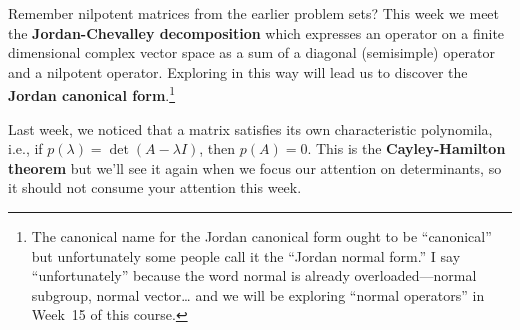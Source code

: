 \documentclass{homework}
\begin{document}
Remember nilpotent matrices from the earlier problem sets?  This week
we meet the \textbf{Jordan-Chevalley decomposition} which expresses an
operator on a finite dimensional complex vector space as a sum of a
diagonal (semisimple) operator and a nilpotent operator.  Exploring in
this way will lead us to discover the \textbf{Jordan canonical
  form}.\footnote{The canonical name for the Jordan canonical form
  ought to be ``canonical'' but unfortunately some people call it the
  ``Jordan normal form.''  I say ``unfortunately'' because the word
  normal is already overloaded---normal subgroup, normal vector\ldots
  and we will be exploring ``normal operators'' in Week~15 of this
  course.}

Last week, we noticed that a matrix satisfies its own characteristic
polynomila, i.e., if $p(\lambda) = \det(A - \lambda I)$, then
$p(A) = 0$.  This is the \textbf{Cayley-Hamilton theorem} but we'll
see it again when we focus our attention on determinants, so it should
not consume your attention this week.


\end{document}

